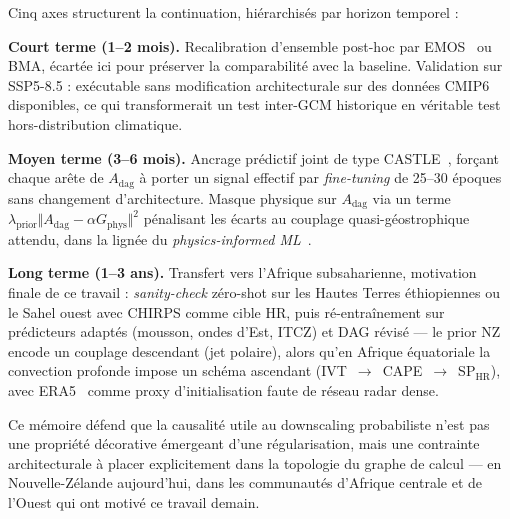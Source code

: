 \documentclass[14pt,a4paper,openany]{extreport}
\newcommand{\Adag}{\ensuremath{A_{\mathrm{dag}}}}
\begin{document}
Cinq axes structurent la continuation, hiérarchisés par horizon temporel :

\textbf{Court terme (1--2 mois).} Recalibration d'ensemble post-hoc par EMOS~\cite{gneiting_emos_2005} ou BMA, écartée ici pour préserver la comparabilité avec la baseline. Validation sur SSP5-8.5 : exécutable sans modification architecturale sur des données CMIP6 disponibles, ce qui transformerait un test inter-GCM historique en véritable test hors-distribution climatique.

\textbf{Moyen terme (3--6 mois).} Ancrage prédictif joint de type CASTLE~\cite{kyono_castle_2020}, forçant chaque arête de $\Adag$ à porter un signal effectif par \emph{fine-tuning} de 25--30 époques sans changement d'architecture. Masque physique sur $\Adag$ via un terme $\lambda_{\mathrm{prior}} \Vert \Adag - \alpha G_{\mathrm{phys}} \Vert^2$ pénalisant les écarts au couplage quasi-géostrophique attendu, dans la lignée du \emph{physics-informed ML}~\cite{karniadakis_pinn_2021}.

\textbf{Long terme (1--3 ans).} Transfert vers l'Afrique subsaharienne, motivation finale de ce travail : \emph{sanity-check} zéro-shot sur les Hautes Terres éthiopiennes ou le Sahel ouest avec CHIRPS comme cible HR, puis ré-entraînement sur prédicteurs adaptés (mousson, ondes d'Est, ITCZ) et DAG révisé --- le prior NZ encode un couplage descendant (jet polaire), alors qu'en Afrique équatoriale la convection profonde impose un schéma ascendant (IVT~$\to$~CAPE~$\to$~SP$_{\mathrm{HR}}$), avec ERA5~\cite{hersbach_era5_2020} comme proxy d'initialisation faute de réseau radar dense.

Ce mémoire défend que la causalité utile au downscaling probabiliste n'est pas une propriété décorative émergeant d'une régularisation, mais une contrainte architecturale à placer explicitement dans la topologie du graphe de calcul --- en Nouvelle-Zélande aujourd'hui, dans les communautés d'Afrique centrale et de l'Ouest qui ont motivé ce travail demain.
\end{document}
